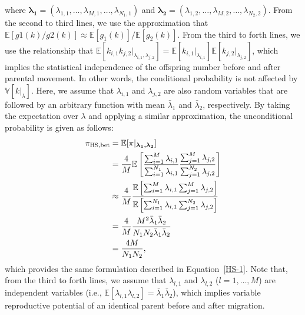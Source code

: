 \documentclass[12pt, English]{article}
\begin{document}
\begin{spacing}{1.9}
where $\boldsymbol{\lambda_1}=(\lambda_{1,1}, \ldots, \lambda_{M,1}, \ldots, \lambda_{N_1,1})$ and $\boldsymbol{\lambda_2}=(\lambda_{1,2}, \ldots, \lambda_{M,2}, \ldots, \lambda_{N_2,2})$. From the second to third lines, we use the approximation that $\mathbb{E}[g1(k)/g2(k)] \approx \mathbb{E}[g_1(k)] / \mathbb{E}[g_2(k)]$. From the third to forth lines, we use the relationship that $\mathbb{E}[k_{i,1}k_{j,2} | _{\lambda_{i,1}, \lambda_{j,2}}] = \mathbb{E}[k_{i,1}|_{\lambda_{i,1}}]\mathbb{E}[k_{j,2}|_{\lambda_{j,2}}]$, which implies the statistical independence of the offspring number before and after parental movement. In other words, the conditional probability is not affected by $\mathbb{V}[k|_\lambda]$. Here, we assume that $\lambda_{i,1}$ and $\lambda_{j,2}$ are also random variables that are followed by an arbitrary function with mean ${\bar \lambda_{1}}$ and ${\bar \lambda_{2}}$, respectively. By taking the expectation over $\lambda$ and applying a similar approximation, the unconditional probability is given as follows:
\begin{align}
\pi_{\rm HS,bet} &= \mathbb{E}[\pi | _{\boldsymbol{\lambda_1, \lambda_2}}] \nonumber\\ 
&= \frac{4}{M} \mathbb{E}\left[\frac{ \sum_{i=1}^M \lambda_{i,1} } { \sum_{i=1}^{N_1} \lambda_{i,1} } \frac{ \sum_{j=1}^M \lambda_{j,2} } { \sum_{j=1}^{N_2} \lambda_{j,2} } \right]   \nonumber\\
&\approx \frac{4}{M} \frac{ \mathbb{E}\left[ \sum_{i=1}^M \lambda_{i,1} \sum_{j=1}^M \lambda_{j,2} \right] } {\mathbb{E}\left[ \sum_{i=1}^{N_1} \lambda_{i,1} \sum_{j=1}^{N_2} \lambda_{j,2}\right]} \nonumber\\
&= \frac{4}{M} \frac{M^2 {\bar \lambda_1} {\bar \lambda_2}}{N_1 N_2 {\bar \lambda_1} {\bar \lambda_2}}\nonumber\\
&= \frac{4M}{N_{1}N_{2}},
\label{App2}
\end{align}
which provides the same formulation described in Equation~\ref{HS-1}. Note that, from the third to forth lines, we assume that $\lambda_{l,1}$ and $\lambda_{l,2}$ ($l = 1, \ldots, M$) are independent variables (i.e., $\mathbb{E}[\lambda_{l,1}\lambda_{l,2}] = {\bar \lambda_{1}}{\bar \lambda_{2}}$), which implies variable reproductive potential of an identical parent before and after migration. 


\end{spacing}
\end{document}
